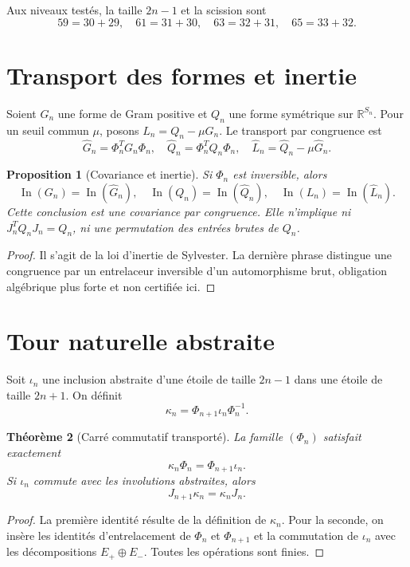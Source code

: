 \documentclass[11pt,a4paper]{article}
\newtheorem{theorem}{Théorème}[section]
\newtheorem{proposition}[theorem]{Proposition}
\theoremstyle{definition}
\newcommand{\In}{\operatorname{In}}
\begin{document}
Aux niveaux testés, la taille $2n-1$ et la scission sont
\[
59=30+29,\quad61=31+30,\quad63=32+31,\quad65=33+32.
\]

\section{Transport des formes et inertie}

Soient $G_n$ une forme de Gram positive et $Q_n$ une forme symétrique sur
$\mathbb{R}^{S_n}$. Pour un seuil commun $\mu$, posons
$L_n=Q_n-\mu G_n$. Le transport par congruence est
\[
 \widehat G_n=\Phi_n^{\!T}G_n\Phi_n,
 \quad \widehat Q_n=\Phi_n^{\!T}Q_n\Phi_n,
 \quad \widehat L_n=\widehat Q_n-\mu\widehat G_n.
\]

\begin{proposition}[Covariance et inertie]
Si $\Phi_n$ est inversible, alors
\[
 \In(G_n)=\In(\widehat G_n),\quad
 \In(Q_n)=\In(\widehat Q_n),\quad
 \In(L_n)=\In(\widehat L_n).
\]
Cette conclusion est une covariance par congruence. Elle n'implique ni
$J_n^TQ_nJ_n=Q_n$, ni une permutation des entrées brutes de $Q_n$.
\end{proposition}

\begin{proof}
Il s'agit de la loi d'inertie de Sylvester. La dernière phrase distingue une congruence
par un entrelaceur inversible d'un automorphisme brut, obligation algébrique plus forte
et non certifiée ici.
\end{proof}

\section{Tour naturelle abstraite}

Soit $\iota_n$ une inclusion abstraite d'une étoile de taille $2n-1$ dans une étoile
de taille $2n+1$. On définit
\[
 \kappa_n=\Phi_{n+1}\iota_n\Phi_n^{-1}.
\]

\begin{theorem}[Carré commutatif transporté]
La famille $(\Phi_n)$ satisfait exactement
\[
 \kappa_n\Phi_n=\Phi_{n+1}\iota_n.
\]
Si $\iota_n$ commute avec les involutions abstraites, alors
\[
 J_{n+1}\kappa_n=\kappa_nJ_n.
\]
\end{theorem}

\begin{proof}
La première identité résulte de la définition de $\kappa_n$. Pour la seconde, on
insère les identités d'entrelacement de $\Phi_n$ et $\Phi_{n+1}$ et la commutation de
$\iota_n$ avec les décompositions $E_+\oplus E_-$. Toutes les opérations sont finies.
\end{proof}
\end{document}
